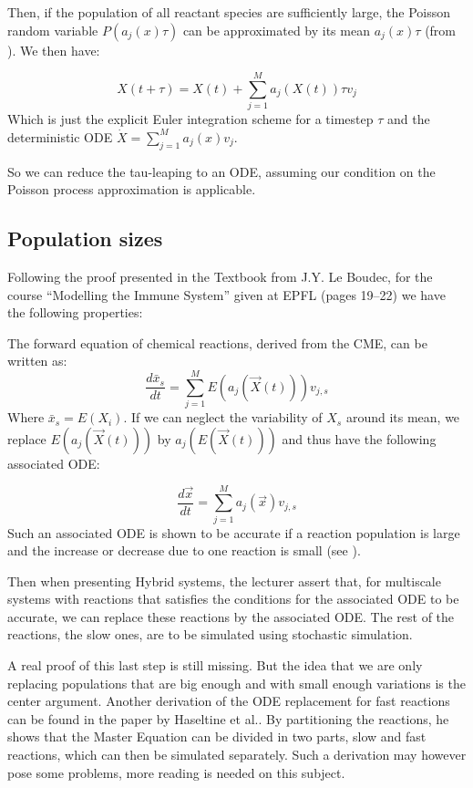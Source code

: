 \documentclass[letterpaper, oneside]{article}
\begin{document}
Then, if the population of all reactant species are sufficiently large, the Poisson random variable $P(a_j(x)\tau)$ can be approximated by its mean $a_j(x)\tau$ (from \cite{Cao:2007p5660}). We then have:

\[
	X(t + \tau) = X(t) + \sum_{j=1}^M a_j(X(t))\tau v_j
\]
Which is just the explicit Euler integration scheme for a timestep $\tau$ and the deterministic ODE $\dot{X}= \sum_{j=1}^M a_j(x) v_j$.

So we can reduce the tau-leaping to an ODE, assuming our condition on the Poisson process approximation is applicable.


\subsection{Population sizes} %
\label{sub:population_sizes}
Following the proof presented in the Textbook from J.Y. Le Boudec, for the course ``Modelling the Immune System'' given at EPFL \cite{LCA-TEACHING-2007-001} (pages 19--22) we have the following properties:

The forward equation of chemical reactions, derived from the CME, can be written as:
\[
	\frac{d\bar{x}_s}{dt} = \sum_{j=1}^M E(a_j(\vec{X}(t))) v_{j,s}
\]
Where $\bar{x}_s = E(X_i)$. If we can neglect the variability of $X_s$ around its mean, we replace $E(a_j(\vec{X}(t)))$ by $a_j(E(\vec{X}(t)))$ and thus have the following associated ODE:

\[
	\frac{d\vec{x}}{dt} = \sum_{j=1}^M a_j(\vec{x}) v_{j,s}
\]
Such an associated ODE is shown to be accurate if a reaction population is large and the increase or decrease due to one reaction is small (see \cite{LCA-TEACHING-2007-001}).

Then when presenting Hybrid systems, the lecturer assert that, for multiscale systems with reactions that satisfies the conditions for the associated ODE to be accurate, we can replace these reactions by the associated ODE. The rest of the reactions, the slow ones, are to be simulated using stochastic simulation.

A real proof of this last step is still missing. But the idea that we are only replacing populations that are big enough and with small enough variations is the center argument.
Another derivation of the ODE replacement for fast reactions can be found in the paper by Haseltine et al.\cite{Haseltine:2002p4632}. By partitioning the reactions, he shows that the Master Equation can be divided in two parts, slow and fast reactions, which can then be simulated separately. Such a derivation may however pose some problems, more reading is needed on this subject.




\end{document}
